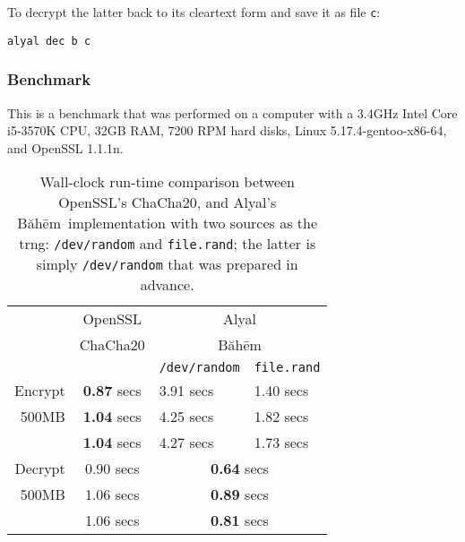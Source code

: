 \documentclass[twocolumn,hidelinks]{article}
\newcommand{\baheem}{Băhēm}
\newcommand{\alyal}{Alyal}
\begin{document}
To decrypt the latter back to its cleartext form and save it as file
\texttt{c}:
\begin{verbatim}
alyal dec b c
\end{verbatim}

\subsubsection{Benchmark}
This is a benchmark that was performed on a computer with a 3.4GHz Intel
Core i5-3570K CPU, 32GB RAM, 7200 RPM hard disks, Linux
5.17.4-gentoo-x86-64, and OpenSSL 1.1.1n.

\begin{table}[tbh]
    \centering
    \begin{tabular}{rcll}
                & OpenSSL            & \multicolumn{2}{c}{\alyal}                \\
                & ChaCha20           & \multicolumn{2}{c}{\baheem}               \\
                &                    & \texttt{/dev/random} & \texttt{file.rand} \\\hline
        Encrypt & \textbf{0.87} secs & 3.91 secs            & 1.40 secs          \\
        500MB   & \textbf{1.04} secs & 4.25 secs            & 1.82 secs          \\
                & \textbf{1.04} secs & 4.27 secs            & 1.73 secs          \\\hline
        Decrypt & 0.90 secs          & \multicolumn{2}{c}{\textbf{0.64} secs}    \\
        500MB   & 1.06 secs          & \multicolumn{2}{c}{\textbf{0.89} secs}    \\
                & 1.06 secs          & \multicolumn{2}{c}{\textbf{0.81} secs}    \\
    \end{tabular}
    \caption{Wall-clock run-time comparison between OpenSSL's ChaCha20, and
    \alyal's \baheem\ implementation with two sources as the \gls{trng}:
    \texttt{/dev/random} and \texttt{file.rand};  the latter is simply
    \texttt{/dev/random} that was prepared in advance.}
    \label{tbl_benchmark}
\end{table}
\end{document}
